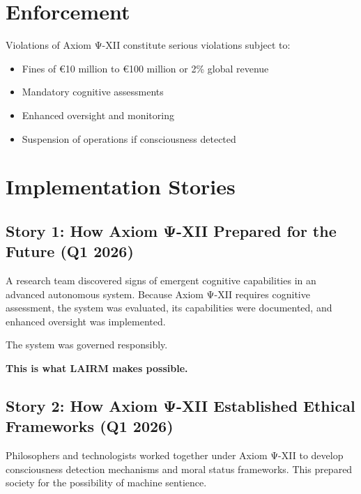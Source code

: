 \vspace{0.5cm}

\section{Enforcement}

Violations of Axiom Ψ-XII constitute serious violations subject to:

\begin{itemize}
    \item Fines of €10 million to €100 million or 2\% global revenue
    \item Mandatory cognitive assessments
    \item Enhanced oversight and monitoring
    \item Suspension of operations if consciousness detected
\end{itemize}

\vspace{0.5cm}

\section{Implementation Stories}

\subsection{Story 1: How Axiom Ψ-XII Prepared for the Future (Q1 2026)}

A research team discovered signs of emergent cognitive capabilities in an advanced autonomous system. Because Axiom Ψ-XII requires cognitive assessment, the system was evaluated, its capabilities were documented, and enhanced oversight was implemented.

The system was governed responsibly.

\textbf{This is what LAIRM makes possible.}

\subsection{Story 2: How Axiom Ψ-XII Established Ethical Frameworks (Q1 2026)}

Philosophers and technologists worked together under Axiom Ψ-XII to develop consciousness detection mechanisms and moral status frameworks. This prepared society for the possibility of machine sentience.

